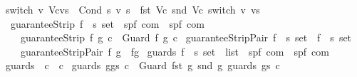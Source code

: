 \begin{isabellebody}
{\isachardoublequoteopen}switch\ v\ {\isacharparenleft}Vc{\isacharhash}vs{\isacharparenright}\ {\isacharequal}\ Cond\ {\isacharbraceleft}s{\isachardot}\ v\ s\ {\isasymin}\ fst\ Vc{\isacharbraceright}\ {\isacharparenleft}snd\ Vc{\isacharparenright}\ {\isacharparenleft}switch\ v\ vs{\isacharparenright}{\isachardoublequoteclose}\isanewline
\isanewline
{}\isamarkupfalse%
\ guaranteeStrip{\isacharcolon}{\isacharcolon}\ {\isachardoublequoteopen}{\isacharprime}f\ {\isasymRightarrow}\ {\isacharprime}s\ set\ {\isasymRightarrow}\ {\isacharparenleft}{\isacharprime}s{\isacharcomma}{\isacharprime}p{\isacharcomma}{\isacharprime}f{\isacharparenright}\ com\ {\isasymRightarrow}\ {\isacharparenleft}{\isacharprime}s{\isacharcomma}{\isacharprime}p{\isacharcomma}{\isacharprime}f{\isacharparenright}\ com{\isachardoublequoteclose}\isanewline
\ \ \ {\isachardoublequoteopen}guaranteeStrip\ f\ g\ c\ {\isacharequal}\ Guard\ f\ g\ c{\isachardoublequoteclose}\isanewline
\isanewline
{}\isamarkupfalse%
\ guaranteeStripPair{\isacharcolon}{\isacharcolon}\ {\isachardoublequoteopen}{\isacharprime}f\ {\isasymRightarrow}\ {\isacharprime}s\ set\ {\isasymRightarrow}\ {\isacharparenleft}{\isacharprime}f\ {\isasymtimes}\ {\isacharprime}s\ set{\isacharparenright}{\isachardoublequoteclose}\isanewline
\ \ \ {\isachardoublequoteopen}guaranteeStripPair\ f\ g\ {\isacharequal}\ {\isacharparenleft}f{\isacharcomma}g{\isacharparenright}{\isachardoublequoteclose}\isanewline
\isanewline
{}\isamarkupfalse%
\ guards{\isacharcolon}{\isacharcolon}\ {\isachardoublequoteopen}{\isacharparenleft}{\isacharprime}f\ {\isasymtimes}\ {\isacharprime}s\ set\ {\isacharparenright}\ list\ {\isasymRightarrow}\ {\isacharparenleft}{\isacharprime}s{\isacharcomma}{\isacharprime}p{\isacharcomma}{\isacharprime}f{\isacharparenright}\ com\ {\isasymRightarrow}\ {\isacharparenleft}{\isacharprime}s{\isacharcomma}{\isacharprime}p{\isacharcomma}{\isacharprime}f{\isacharparenright}\ com{\isachardoublequoteclose}\isanewline
{}\isanewline
{\isachardoublequoteopen}guards\ {\isacharbrackleft}{\isacharbrackright}\ c\ {\isacharequal}\ c{\isachardoublequoteclose}\ {\isacharbar}\isanewline
{\isachardoublequoteopen}guards\ {\isacharparenleft}g{\isacharhash}gs{\isacharparenright}\ c\ {\isacharequal}\ Guard\ {\isacharparenleft}fst\ g{\isacharparenright}\ {\isacharparenleft}snd\ g{\isacharparenright}\ {\isacharparenleft}guards\ gs\ c{\isacharparenright}{\isachardoublequoteclose}\isanewline
\isanewline
{}\isamarkupfalse%

\end{isabellebody}
